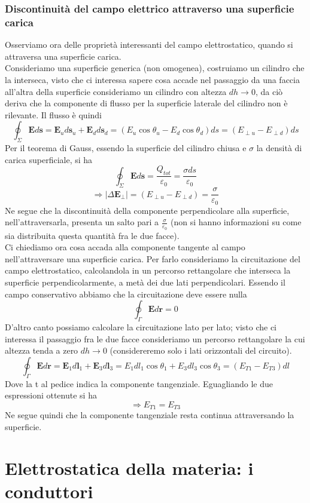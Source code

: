 \documentclass[
10pt, %
a4paper, %
oneside, %
headinclude,footinclude, %
BCOR5mm, %
]{scrartcl}
\begin{document}
\subsubsection{Discontinuità del campo elettrico attraverso una superficie carica}
Osserviamo ora delle proprietà interessanti del campo elettrostatico, quando si attraversa una superficie carica.\\
Consideriamo una superficie generica (non omogenea), costruiamo un cilindro che la interseca, visto che ci interessa sapere cosa accade nel passaggio da una faccia all'altra della superficie consideriamo un cilindro con altezza \(dh\to 0\), da ciò deriva che la componente di flusso per la superficie laterale del cilindro non è rilevante. Il flusso è quindi
\[\oint_{\Sigma}\mathbf{E}d\mathbf{s} = \mathbf{E}_{u}d\mathbf{s}_{u}+\mathbf{E}_{d}d\mathbf{s}_d=(E_u\cos\theta_u-E_d\cos\theta_d)ds = (E_{\perp u}-E_{\perp d})ds\] 
Per il teorema di Gauss, essendo la superficie del cilindro chiusa e $\sigma$ la densità di carica superficiale, si ha
\[\oint_{\Sigma}\mathbf{E}d\mathbf{s} = \frac{Q_{tot}}{\varepsilon_0} = \frac{\sigma ds}{\varepsilon_0}\] 
\[\Rightarrow |\Delta \mathbf{E}_{\perp}| = (E_{\perp u} - E_{\perp d}) = \frac{\sigma}{\varepsilon_0}\]
Ne segue che la discontinuità della componente perpendicolare alla superficie, nell'attraversarla, presenta un salto pari a \(\frac{\sigma}{\varepsilon_0}\) (non si hanno informazioni su come sia distribuita questa quantità fra le due facce).\\
Ci chiediamo ora cosa accada alla componente tangente al campo nell'attraversare una superficie carica. Per farlo consideriamo la circuitazione del campo elettrostatico, calcolandola in un percorso rettangolare che interseca la superficie perpendicolarmente, a metà dei due lati perpendicolari. Essendo il campo conservativo abbiamo che la circuitazione deve essere nulla
\[\oint_\Gamma\mathbf{E}d\mathbf{r} = 0\]
D'altro canto possiamo calcolare la circuitazione lato per lato; visto che ci interessa il passaggio fra le due facce consideriamo un percorso rettangolare la cui altezza tenda a zero \(dh\to 0\) (considereremo solo i lati orizzontali del circuito).  
\[\oint_\Gamma \mathbf{E}d\mathbf{r} = \mathbf{E}_1 d\mathbf{l}_1 + \mathbf{E}_3d\mathbf{l}_3 = E_1dl_1\cos\theta_1 + E_3dl_3\cos\theta_3 = (E_{T1}-E_{T3})dl\]
Dove la t al pedice indica la componente tangenziale. Eguagliando le due espressioni ottenute si ha
\[\Rightarrow E_{T1}=E_{T3}\]
Ne segue quindi che la componente tangenziale resta continua attraversando la superficie. 
\newpage
\section{Elettrostatica della materia: i conduttori}
\end{document}
